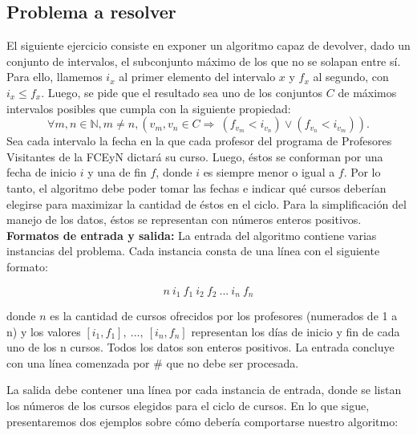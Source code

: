 \subsection{Problema a resolver}
El siguiente ejercicio consiste en exponer un algoritmo capaz de devolver, dado un conjunto de intervalos, el subconjunto máximo de los que no se solapan entre sí. Para ello, llamemos $i_{x}$ al primer elemento del intervalo $x$ y $f_{x}$ al segundo, con $i_{x} \leq f_{x}$. Luego, se pide que el resultado sea uno de los conjuntos $C$ de máximos intervalos posibles que cumpla con la siguiente propiedad: $$\forall m, n \in \mathbb{N}, m \neq n, (v_{m}, v_{n} \in C \Rightarrow \ (f_{v_{m}} < i_{v_{n}}) \vee (f_{v_{n}} < i_{v_{m}})).$$\newline
 Sea cada intervalo la fecha en la que cada profesor del programa de Profesores Visitantes de la FCEyN dictará su curso. Luego, éstos se conforman por una fecha de inicio $i$ y una de fin $f$, donde $i$ es siempre menor o igual a $f$.  Por lo tanto, el algoritmo debe poder tomar las fechas e indicar qué cursos deberían elegirse para maximizar la cantidad de éstos en el ciclo. Para la simplificación del manejo de los datos, éstos se representan con números enteros positivos.\newline
\newline
\textbf {Formatos de entrada y salida:}\newline
\newline
La entrada del algoritmo contiene varias instancias del problema. Cada instancia consta de una línea con el siguiente formato:

$$n\ i_{1}\ f_{1}\ i_{2}\ f_{2}\ ...\ i_{n}\ f_{n}$$


donde \textbf{$n$} es la cantidad de cursos ofrecidos por los profesores (numerados de 1 a n) y los valores \textbf{$[i_{1},f_{1}],\ ...,\ [i_{n},f_{n}]$} representan los días de inicio y fin de cada uno de los n cursos. Todos los datos son enteros positivos. La entrada concluye con una línea comenzada por \# que no debe ser procesada.\newline

La salida debe contener una línea por cada instancia de entrada, donde se listan los números de los cursos elegidos para el ciclo de cursos.\newline
\newline
En lo que sigue, presentaremos dos ejemplos sobre cómo debería comportarse nuestro algoritmo:\newline

